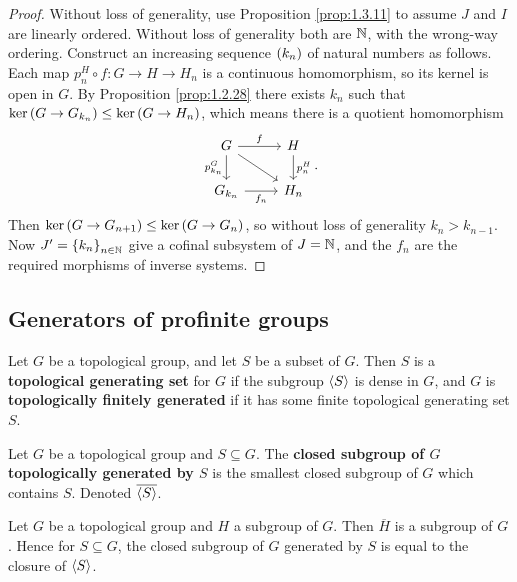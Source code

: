 \begin{proof}
Without loss of generality, use Proposition \ref{prop:1.3.11} to assume $ J $ and $ I $ are linearly ordered. Without loss of generality both are $ \mathbb{N} $, with the wrong-way ordering. Construct an increasing sequence $ \br{k_n} $ of natural numbers as follows. Each map $ p_n^H \circ f : G \to H \to H_n $ is a continuous homomorphism, so its kernel is open in $ G $. By Proposition \ref{prop:1.2.28} there exists $ k_n $ such that $ \ker \br{G \to G_{k_n}} \le \ker \br{G \to H_n} $, which means there is a quotient homomorphism
$$
\begin{tikzcd}
G \arrow{r}{f} \arrow{d}[swap]{p_{k_n}^G} \arrow{dr} & H \arrow{d}{p_n^H} \\
G_{k_n} \arrow{r}[swap]{f_n} & H_n
\end{tikzcd}.
$$
Then $ \ker \br{G \to G_{n + 1}} \le \ker \br{G \to G_n} $, so without loss of generality $ k_n > k_{n - 1} $. Now $ J' = \cbr{k_n}_{n \in \NN} $ give a cofinal subsystem of $ J = \mathbb{N} $, and the $ f_n $ are the required morphisms of inverse systems.
\end{proof}

\subsection{Generators of profinite groups}

\begin{definition}
Let $ G $ be a topological group, and let $ S $ be a subset of $ G $. Then $ S $ is a \textbf{topological generating set} for $ G $ if the subgroup $ \left\langle S \right\rangle $ is dense in $ G $, and $ G $ is \textbf{topologically finitely generated} if it has some finite topological generating set $ S $.
\end{definition}

\pagebreak

\begin{definition}
Let $ G $ be a topological group and $ S \subseteq G $. The \textbf{closed subgroup of $ G $ topologically generated by $ S $} is the smallest closed subgroup of $ G $ which contains $ S $. Denoted $ \overline{\left\langle S \right\rangle} $.
\end{definition}

\begin{proposition}
Let $ G $ be a topological group and $ H $ a subgroup of $ G $. Then $ \overline{H} $ is a subgroup of $ G $. Hence for $ S \subseteq G $, the closed subgroup of $ G $ generated by $ S $ is equal to the closure of $ \left\langle S \right\rangle $.
\end{proposition}

